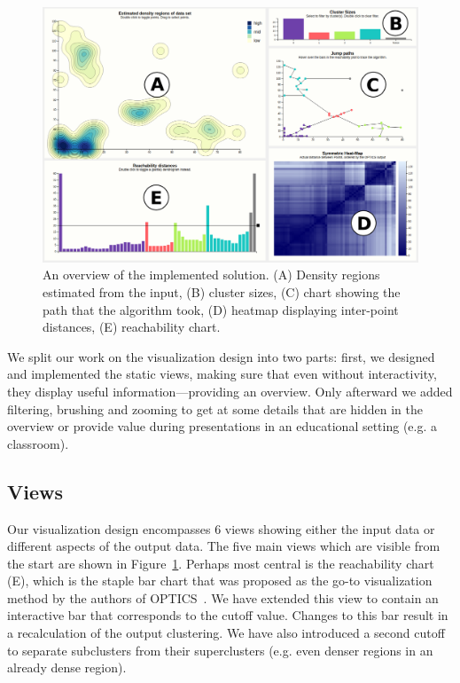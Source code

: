 \documentclass{vgtc} %
\begin{document}
\begin{figure}[t]
    \centering
    \includegraphics[width=\columnwidth]{opticsvis-overview}
    \caption{An overview of the implemented solution. (A) Density regions estimated from the input, (B) cluster sizes, (C) chart showing the path that the algorithm took, (D) heatmap displaying inter-point distances, (E) reachability chart.}
    \label{fig:overview}
\end{figure}

We split our work on the visualization design into two parts: first, we
designed and implemented the static views, making sure that even without
interactivity, they display useful information---providing an overview. Only
afterward we added filtering, brushing and zooming to get at some details that
are hidden in the overview or provide value during presentations in an
educational setting (e.g. a classroom).

\subsection{Views}

Our visualization design encompasses 6 views showing either the input data or
different aspects of the output data. The five main views which are visible
from the start are shown in Figure~\ref{fig:overview}. Perhaps most central is
the reachability chart (E), which is the staple bar chart that was proposed as
the go-to visualization method by the authors of OPTICS~\cite{optics}. We have
extended this view to contain an interactive bar that corresponds to the cutoff
value.  Changes to this bar result in a recalculation of the output clustering.
We have also introduced a second cutoff to separate subclusters from their
superclusters (e.g. even denser regions in an already dense region).
\end{document}

